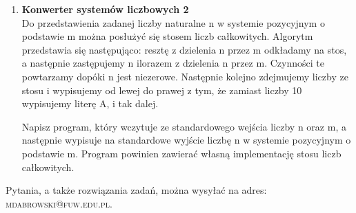 \documentclass[12pt]{article}
\begin{document}
\begin{enumerate}
\item \textbf{Konwerter systemów liczbowych 2}\\
Do przedstawienia zadanej liczby naturalne n w systemie pozycyjnym o podstawie m można posłużyć się stosem liczb całkowitych. Algorytm przedstawia się następująco: resztę z dzielenia n przez m odkładamy na stos, a następnie zastępujemy n ilorazem z dzielenia n przez m. Czynności te powtarzamy dopóki n jest niezerowe. Następnie kolejno zdejmujemy liczby ze stosu i wypisujemy od lewej do prawej z tym, że zamiast liczby 10 wypisujemy literę A, i tak dalej.

\vspace{0.2 cm}

Napisz program, który wczytuje ze standardowego wejścia liczby n oraz m, a następnie wypisuje na standardowe wyjście liczbę n w systemie pozycyjnym o podstawie m. Program powinien zawierać własną implementację stosu liczb całkowitych.

\end{enumerate}
\vspace{1cm}
\small Pytania, a także rozwiązania zadań, można wysyłać na adres: \textsc{mdabrowski@fuw.edu.pl}.
\end{document}
